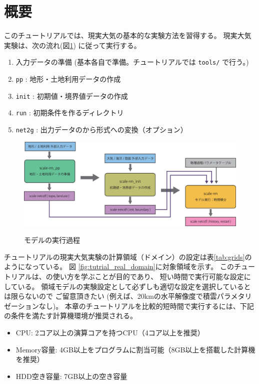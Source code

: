 \section{概要} \label{sec:tutrial_real_intro}
このチュートリアルでは、現実大気の基本的な実験方法を習得する。
現実大気実験は、次の流れ(図\ref{fig:howto}) に従って実行する。
\begin{enumerate}
\item  入力データの準備 (基本各自で準備。チュートリアルでは \verb|tools/| で行う。)
\item  \texttt{pp}      : 地形・土地利用データの作成
\item  \texttt{init}    : 初期値・境界値データの作成
\item  \texttt{run}     : 初期条件を作るディレクトリ
\item  \texttt{net2g}   : 出力データの\netcdf から\grads 形式への変換（オプション） 
\end{enumerate}

\begin{figure}[b]
\begin{center}
  \includegraphics[width=0.9\hsize]{./figure/real_procedure.eps}\\
  \caption{\scalerm モデルの実行過程}
  \label{fig:howto}
\end{center}
\end{figure}


チュートリアルの現実大気実験の計算領域（ドメイン）の設定は表\ref{tab:grids}のようになっている。
図 \ref{fig:tutrial_real_domain}に対象領域を示す。
このチュートリアルは、\scalerm の使い方を学ぶことが目的であり、
短い時間で実行可能な設定にしている。
領域モデルの実験設定として必ずしも適切な設定を選択しているとは限らないので
ご留意頂きたい
(例えば、20kmの水平解像度で積雲パラメタリゼーションなし)。
本章のチュートリアルを比較的短時間で実行するには、下記の条件を満たす計算機環境が推奨される。
\begin{itemize}
\item CPU: 2コア以上の演算コアを持つCPU（4コア以上を推奨）
\item Memory容量: 4GB以上をプログラムに割当可能（8GB以上を搭載した計算機を推奨）
\item HDD空き容量: 7GB以上の空き容量
\end{itemize}


